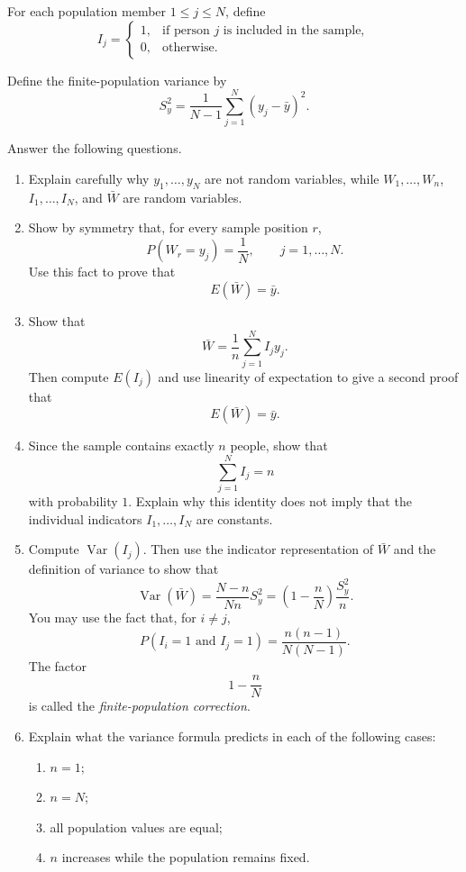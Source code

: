 \documentclass[11pt]{article}
\begin{document}
For each population member \(1\leq j\leq N\), define
\[
I_j=
\begin{cases}
1, & \text{if person \(j\) is included in the sample},\\
0, & \text{otherwise}.
\end{cases}
\]

Define the finite-population variance by
\[
S_y^2
=
\frac{1}{N-1}\sum_{j=1}^N (y_j-\bar y)^2.
\]

Answer the following questions.

\begin{enumerate}[label=(\alph*), leftmargin=*]

\item Explain carefully why \(y_1,\dots,y_N\) are not random variables, while
\(W_1,\dots,W_n\), \(I_1,\dots,I_N\), and \(\bar W\) are random variables.

\item Show by symmetry that, for every sample position \(r\),
\[
P(W_r=y_j)=\frac{1}{N},
\qquad j=1,\dots,N.
\]
Use this fact to prove that
\[
E(\bar W)=\bar y.
\]

\item Show that
\[
\bar W=\frac{1}{n}\sum_{j=1}^N I_jy_j.
\]
Then compute \(E(I_j)\) and use linearity of expectation to give a second proof
that
\[
E(\bar W)=\bar y.
\]

\item Since the sample contains exactly \(n\) people, show that
\[
\sum_{j=1}^N I_j=n
\]
with probability \(1\). Explain why this identity does not imply that the
individual indicators \(I_1,\dots,I_N\) are constants.



\item Compute \(\operatorname{Var}(I_j)\). Then use the indicator
representation of \(\bar W\) and the definition of variance to show that
\[
\operatorname{Var}(\bar W)
=
\frac{N-n}{Nn}S_y^2
=
\left(1-\frac{n}{N}\right)\frac{S_y^2}{n}.
\]
You may use the fact that, for \(i\neq j\),
\[
P(I_i=1 \text{ and } I_j=1)
=
\frac{n(n-1)}{N(N-1)}.
\]
The factor
\[
1-\frac{n}{N}
\]
is called the \emph{finite-population correction}.





 

\item Explain what the variance formula predicts in each of the following
cases:
\begin{enumerate}[label=(\roman*), leftmargin=2em]
    \item \(n=1\);
    \item \(n=N\);
    \item all population values are equal;
    \item \(n\) increases while the population remains fixed.
\end{enumerate}


\end{enumerate}
\end{document}
